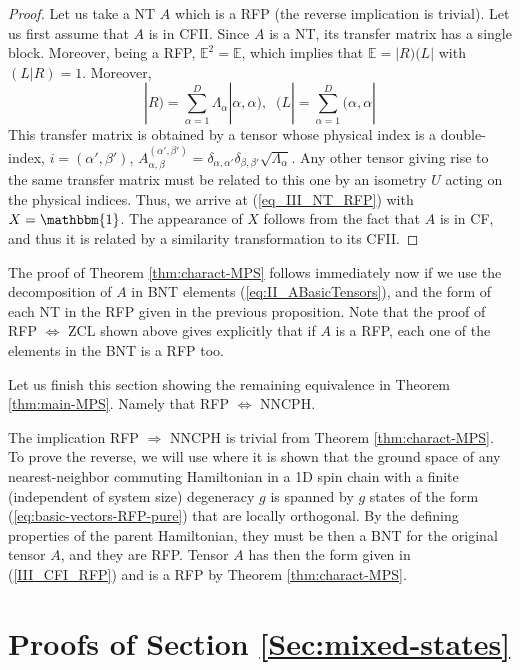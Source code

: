 \documentclass{elsarticle}
\newcommand{\Id}{\mathbbm{1}}
\newcommand{\be}{\begin{equation}}
\newcommand{\ee}{\end{equation}}
\begin{document}
\begin{proof}
Let us take a NT $A$ which is a RFP (the reverse implication is trivial). Let us first assume that $A$ is in CFII.
Since $A$ is a NT, its transfer matrix has a single block.
Moreover, being a RFP, $\mathbb{E}^2=\mathbb{E}$, which implies that $\mathbb{E}=|R)(L|$ with $(L|R)=1$. Moreover,
 \be
 |R)= \sum_{\alpha=1}^D \Lambda_\alpha |\alpha,\alpha),\;\;
 (L|=\sum_{\alpha=1}^D (\alpha,\alpha|
 \ee
This transfer matrix is obtained by a tensor whose physical index is a double-index, $i=(\alpha',\beta')$,  $A^{(\alpha',\beta')}_{\alpha,\beta}= \delta_{\alpha,\alpha'}\delta_{\beta,\beta'} \sqrt{\Lambda_\alpha}$. Any other tensor giving rise to the same transfer matrix must be related to this one by an isometry $U$ acting on the physical indices. Thus, we arrive at (\ref{eq_III_NT_RFP}) with $X=\Id$. The appearance of $X$ follows from the fact that $A$ is in CF, and thus it is related by a similarity transformation to its CFII.
\end{proof}

The proof of Theorem \ref{thm:charact-MPS} follows immediately now  if we use the decomposition of $A$ in BNT elements (\ref{eq:II_ABasicTensors}), and the form of each NT in the RFP given in the previous proposition. Note that the proof of RFP $\Leftrightarrow$ ZCL shown above gives explicitly that if $A$ is a RFP, each one of the elements in the BNT is a RFP too.

Let us finish this section showing the remaining equivalence in Theorem \ref{thm:main-MPS}. Namely that RFP $\Leftrightarrow$ NNCPH.

The implication RFP $\Rightarrow$ NNCPH is trivial from Theorem \ref{thm:charact-MPS}. To prove the reverse, we will use \cite{Beigi} where it is shown that the ground space of any nearest-neighbor commuting Hamiltonian in a 1D spin chain with a finite (independent of system size) degeneracy $g$ is spanned by $g$ states of the form (\ref{eq:basic-vectors-RFP-pure}) that are locally orthogonal. By the defining properties of the parent Hamiltonian, they must be then a BNT for the original tensor $A$, and they are RFP. Tensor $A$ has then the form given in (\ref{III_CFI_RFP}) and is a RFP by Theorem \ref{thm:charact-MPS}.



\section{Proofs of Section \ref{Sec:mixed-states}}
\label{AppendixMixed}
\end{document}
